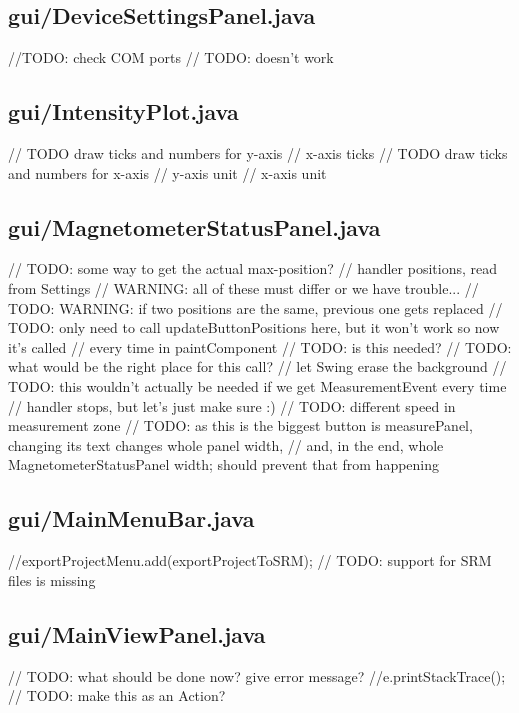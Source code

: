 \subsection{gui/DeviceSettingsPanel.java}
            //TODO: check COM ports
            // TODO: doesn't work

\subsection{gui/IntensityPlot.java}
        // TODO draw ticks and numbers for y-axis
        // x-axis ticks
        // TODO draw ticks and numbers for x-axis
        // y-axis unit
        // x-axis unit

\subsection{gui/MagnetometerStatusPanel.java}
    // TODO: some way to get the actual max-position?
    // handler positions, read from Settings
    // WARNING: all of these must differ or we have trouble...
        // TODO: WARNING: if two positions are the same, previous one gets replaced
        // TODO: only need to call updateButtonPositions here, but it won't work so now it's called
        // every time in paintComponent
        // TODO: is this needed?
        // TODO: what would be the right place for this call?
        // let Swing erase the background
                // TODO: this wouldn't actually be needed if we get MeasurementEvent every time
                // handler stops, but let's just make sure :)
                // TODO: different speed in measurement zone
            // TODO: as this is the biggest button is measurePanel, changing its text changes whole panel width,
            // and, in the end, whole MagnetometerStatusPanel width; should prevent that from happening

\subsection{gui/MainMenuBar.java}
            //exportProjectMenu.add(exportProjectToSRM);    // TODO: support for SRM files is missing

\subsection{gui/MainViewPanel.java}
                    // TODO: what should be done now? give error message?
                    //e.printStackTrace();
        // TODO: make this as an Action?

